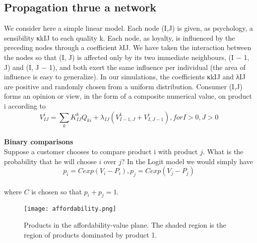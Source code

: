 \subsection{Propagation thrue a network} \label{subsec:propagation}
We consider here a simple linear model. Each node (I,J) is given, as psychology, a sensibility κkIJ to each quality k.
Each node, as loyalty, is influenced by the preceding nodes through a coefficient λIJ.
We have taken the interaction between the nodes so that (I, J) is affected only by its two immediate neighbours,
(I − 1, J) and (I, J − 1), and both exert the same influence per individual (the area of influence is easy to generalize).
In our simulations, the coefficients κkIJ and λIJ are positive and randomly chosen from a uniform distribution.
Consumer (I,J) forms an opinion or view, in the form of a composite numerical value, on product i according to
$$V_{IJ}^{i} = \sum_k K_{IJ}^kQ_{ki} + \lambda_{IJ}(V_{I-1,J}^1+V_{I,J-1}^i), for I > 0, J > 0$$
\\
\textbf{Binary comparisons} \label{subsec:binary}\\
Suppose a customer chooses to compare product i with product $j$.
What is the probability that he will choose $i$ over $j$?
In the Logit model we would simply have
\\
\begin{equation} \label{eq:15}
p_i = C exp(V_i - P_i), p_j = C exp(V_j - P_j)
\end{equation}
\\
where $C$ is chosen so that $p_i + p_j = 1$.

\begin{figure}[h!]
	\begin{center}
		\texttt{[image: affordability.png]}
	\end{center}
	\caption{Products in the affordability-value plane.
	The shaded region is the region of products dominated by product 1.}
	\label{Affordability of products}
\end{figure}

